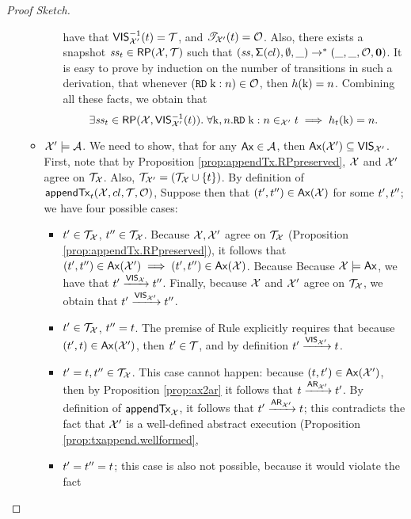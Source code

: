\begin{proof}[Proof Sketch]
\begin{itemize}
\begin{itemize}
\begin{itemize}
			have that ${\mathsf{VIS}}_{\mathcal{X}'}^{-1}(t) = \mathcal{T}$, and $\mathscr{T}_{\mathcal{X}'}(t) = \mathcal{O}$. 
			Also, there exists a snapshot $\mathit{ss}_{t} \in \mathsf{RP}(\mathcal{X}, \mathcal{T})$ such that $(\mathit{ss},\mathsf{\Sigma}(cl), \emptyset, \_) \rightarrow^{\ast}  
			(\_, \_, \mathcal{O}, \mathbf{0})$. It is easy to prove by induction on the number of transitions in such a derivation, that 
			whenever $({{\tt RD}}\;\mathrm{k} : n) \in \mathcal{O}$, then $h(\mathrm{k}) = n$. Combining all these facts, 
			we obtain that 
			\[
			\exists \mathit{ss}_{t} \in \mathsf{RP}(\mathcal{X}, {\mathsf{VIS}}^{-1}_{\mathcal{X}'}(t)).\; \forall \mathrm{k},n.{{\tt RD}}\;\mathrm{k}:n \in_{\mathcal{X}'} t 
			\implies h_{t}(\mathrm{k}) = n.
			\]
		\end{itemize}
		\item $\mathcal{X}' \models \mathcal{A}$. We need to show, that for any $\mathsf{Ax} \in \mathcal{A}$, then 
		$\mathsf{Ax}(\mathcal{X}') \subseteq {\mathsf{VIS}}_{\mathcal{X}'}$. 
		First, note that by Proposition \ref{prop:appendTx.RPpreserved}, $\mathcal{X}$ and $\mathcal{X}'$ 
		agree on $\mathcal{T}_{\mathcal{X}}$. Also, $\mathcal{T}_{\mathcal{X}'} = (\mathcal{T}_{\mathcal{X}} \cup \{t\})$. 
		By definition of $\mathsf{appendTx}_{t}(\mathcal{X}, cl, \mathcal{T}, \mathcal{O})$, 
		Suppose then that  $(t', t'') \in \mathsf{Ax}(\mathcal{X})$ for some $t', t''$; we have four possible cases:
		\begin{itemize}
			\item $t' \in \mathcal{T}_{\mathcal{X}}$, $t'' \in \mathcal{T}_{\mathcal{X}}$. Because $\mathcal{X}, \mathcal{X}'$ agree on $\mathcal{T}_{\mathcal{X}}$ 
			(Proposition \ref{prop:appendTx.RPpreserved}), 
			it follows that $(t', t'') \in \mathsf{Ax}(\mathcal{X}') \implies (t', t'') \in \mathsf{Ax}(\mathcal{X})$. Because 
			Because $\mathcal{X} \models \mathsf{Ax}$, we have that $t' \xrightarrow{{\mathsf{VIS}}_{\mathcal{X}}} t''$. Finally, 
			because $\mathcal{X}$ and $\mathcal{X}'$ agree on $\mathcal{T}_{\mathcal{X}}$, we obtain that $t' \xrightarrow{{\mathsf{VIS}}_{\mathcal{X}'}} t''$. 
			\item $t' \in \mathcal{T}_{\mathcal{X}}$, $t'' = t$. The premise of Rule  explicitly requires that 
			because $(t', t) \in \mathsf{Ax}(\mathcal{X}')$, then $t' \in \mathcal{T}$, and by definition $t' \xrightarrow{{\mathsf{VIS}}_{\mathcal{X}'}} t$.
			\item $t' = t, t'' \in \mathcal{T}_{\mathcal{X}}$. This case cannot happen: because $(t, t') \in \mathsf{Ax}(\mathcal{X}')$, 
			then by Proposition \ref{prop:ax2ar} it follows that $t \xrightarrow{{\sf{AR}}_{\mathcal{X}'}} t'$. By definition of 
			$\mathsf{appendTx}_{\mathcal{X}}$, it follows that $t' \xrightarrow{{\sf{AR}}_{\mathcal{X}'}} t$; this contradicts the 
			fact that $\mathcal{X}'$ is a well-defined abstract execution (Proposition \ref{prop:txappend.wellformed},
			\item $t' = t'' = t$; this case is also not possible, because it would violate the fact 

\end{itemize}
\end{itemize}
\end{itemize}
\end{proof}
